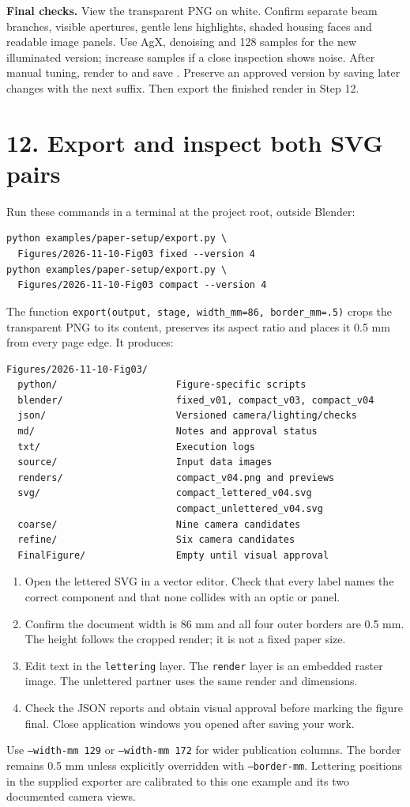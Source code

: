 \documentclass[11pt,a4paper]{article}
\begin{document}
\textbf{Final checks.} View the transparent PNG on white. Confirm separate beam branches, visible apertures, gentle lens highlights, shaded housing faces and readable image panels. Use AgX, denoising and 128 samples for the new illuminated version; increase samples if a close inspection shows noise. After manual tuning, render to  and save . Preserve an approved version by saving later changes with the next suffix. Then export the finished render in Step 12.

\clearpage
\section*{12. Export and inspect both SVG pairs}
Run these commands in a terminal at the project root, outside Blender:
\begin{Verbatim}[fontsize=\small]
python examples/paper-setup/export.py \
  Figures/2026-11-10-Fig03 fixed --version 4
python examples/paper-setup/export.py \
  Figures/2026-11-10-Fig03 compact --version 4
\end{Verbatim}
The function \texttt{export(output, stage, width\_mm=86, border\_mm=.5)} crops the transparent PNG to its content, preserves its aspect ratio and places it 0.5 mm from every page edge. It produces:
\begin{Verbatim}[fontsize=\small]
Figures/2026-11-10-Fig03/
  python/                     Figure-specific scripts
  blender/                    fixed_v01, compact_v03, compact_v04
  json/                       Versioned camera/lighting/checks
  md/                         Notes and approval status
  txt/                        Execution logs
  source/                     Input data images
  renders/                    compact_v04.png and previews
  svg/                        compact_lettered_v04.svg
                              compact_unlettered_v04.svg
  coarse/                     Nine camera candidates
  refine/                     Six camera candidates
  FinalFigure/                Empty until visual approval
\end{Verbatim}
\begin{enumerate}
\item Open the lettered SVG in a vector editor. Check that every label names the correct component and that none collides with an optic or panel.
\item Confirm the document width is 86 mm and all four outer borders are 0.5 mm. The height follows the cropped render; it is not a fixed paper size.
\item Edit text in the \texttt{lettering} layer. The \texttt{render} layer is an embedded raster image. The unlettered partner uses the same render and dimensions.
\item Check the JSON reports and obtain visual approval before marking the figure final. Close application windows you opened after saving your work.
\end{enumerate}
Use \texttt{--width-mm 129} or \texttt{--width-mm 172} for wider publication columns. The border remains 0.5 mm unless explicitly overridden with \texttt{--border-mm}. Lettering positions in the supplied exporter are calibrated to this one example and its two documented camera views.
\end{document}
